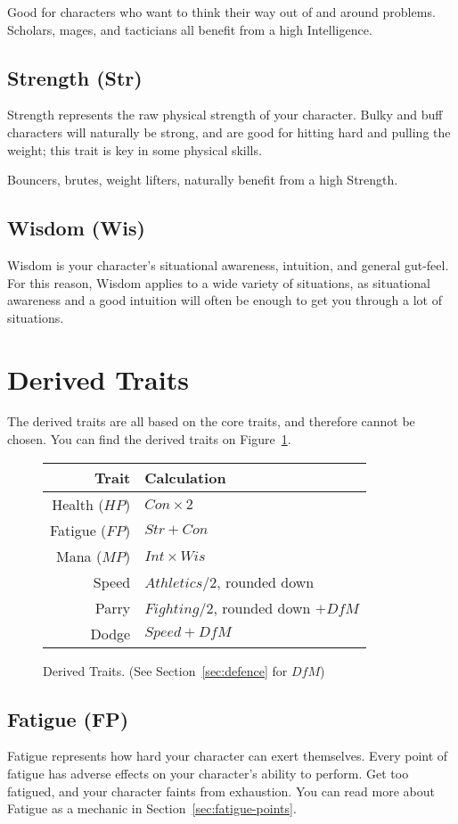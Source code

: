Good for characters who want to think their way out of and around problems.
Scholars, mages, and tacticians all benefit from a high Intelligence.

\subsection{Strength (Str)}
Strength represents the raw physical strength of your character.
Bulky and buff characters will naturally be strong, and are good for hitting hard and pulling the weight; this trait is key in some physical skills.

Bouncers, brutes, weight lifters, naturally benefit from a high Strength.

\subsection{Wisdom (Wis)}
Wisdom is your character's situational awareness, intuition, and general gut-feel.
For this reason, Wisdom applies to a wide variety of situations, as situational awareness and a good intuition will often be enough to get you through a lot of situations.

\section{Derived Traits}
The derived traits are all based on the core traits, and therefore cannot be chosen. 
You can find the derived traits on Figure~\ref{fig:derived_traits}.

\begin{figure}[!ht]
    \centering
\begin{tabular}{r | l}
    \textbf{Trait} & \textbf{Calculation} \\\hline
    Health  ($HP$) & $Con\times 2$ \\
    Fatigue ($FP$) & $Str + Con$ \\
    Mana    ($MP$) & $Int\times Wis$ \\
    Speed          & $Athletics / 2$, rounded down\\
    Parry          & $Fighting/2$, rounded down $+ \mathit{DfM}$\\
    Dodge          & $Speed + \mathit{DfM}$
\end{tabular}
    \caption{Derived Traits. (See Section~\ref{sec:defence} for $\mathit{DfM}$)}
    \label{fig:derived_traits}
\end{figure}

\subsection{Fatigue (FP)}
Fatigue represents how hard your character can exert themselves.
Every point of fatigue has adverse effects on your character's ability to perform.
Get too fatigued, and your character faints from exhaustion.
You can read more about Fatigue as a mechanic in Section~\ref{sec:fatigue-points}.

